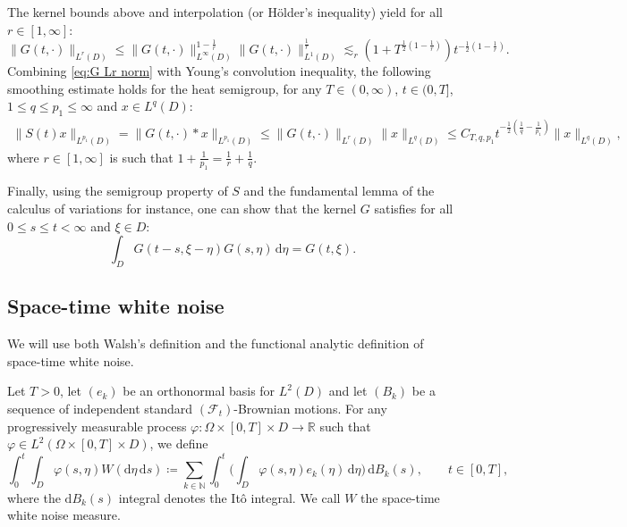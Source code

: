 \documentclass[10pt,a4paper]{amsart}
\numberwithin{equation}{section}
\newcommand{\N}{\mathbb{N}}
\newcommand{\R}{\mathbb{R}}
\newcommand{\ceqq}{\coloneqq}
\newcommand{\col}{\colon}
\newcommand{\F}{{\mathscr F}}
\newcommand{\Om}{\Omega}
\newcommand{\dd}{\,\mathrm{d}}
\newcommand{\ddd}{\mathrm{d}}
\begin{document}
The kernel bounds above and  interpolation (or H\"older's inequality) yield for all $r\in[1,\infty]$:
\begin{equation}\label{eq:G Lr norm}
    \|G(t,\cdot)\|_{L^r(D)}\leq \|G(t,\cdot)\|_{L^\infty(D)}^{1-\frac1r}\|G(t,\cdot)\|_{L^1(D)}^{\frac1r}
    \lesssim_r (1+T^{\frac12(1-\frac1r)})t^{-\frac12(1-\frac1r)}.
\end{equation}
Combining \eqref{eq:G Lr norm} with Young's convolution inequality, the following smoothing estimate holds for the heat semigroup, for any $T\in(0,\infty)$, $t\in(0,T]$, $1\leq q\leq p_1\leq \infty$ and $x\in L^q(D)$: 
\begin{align}
  \|S(t)x\|_{L^{p_1}(D)} =\|G(t,\cdot)*x\|_{L^{p_1}(D)}  
\leq \|G(t,\cdot)\|_{L^r(D)}\|x\|_{L^q(D)} 
\leq  C_{T,q,p_1} t^{-\frac12(\frac1q-\frac{1}{p_1})}\|x\|_{L^q(D)}, \label{eq:est}
\end{align}
where $r\in[1,\infty]$ is such that $1+\frac{1}{p_1}=\frac1r+\frac1q$.  

Finally, using the semigroup property of $S$ and the fundamental lemma of the calculus of variations for instance, one can show that the kernel $G$ satisfies for all $0\leq s\leq t<\infty$ and  $\xi\in D$: 
\begin{equation}\label{eq:kernel semigrp prop}
  \int_D G(t-s,\xi-\eta)G(s,\eta) \dd\eta = G(t,\xi). 
\end{equation}

\subsection{Space-time white noise}\label{sub:white noise}

We will use both Walsh's definition and the functional analytic definition of space-time white noise. 

Let $T>0$, let $(e_k)$ be an orthonormal basis for $L^2(D)$ and let $(B_k)$ be a sequence of independent standard $(\F_t)$-Brownian motions. 
For any progressively measurable process $\varphi\col \Om\times [0,T]\times D\to \R$ such that $\varphi\in L^2(\Om\times[0,T]\times D)$, we define 
\begin{equation}\label{eq:Walsh int}
\int_0^t\int_D \varphi(s,\eta)W(\ddd\eta\dd s)\ceqq \sum_{k\in \N}\int_0^t\Big(\int_D\varphi(s,\eta)e_k(\eta)\dd \eta\Big)\dd B_k(s), \qquad t\in[0,T],
\end{equation}
where the $\ddd B_k(s)$ integral denotes the It\^o integral. We call $W$ the space-time white noise measure. 
 
\end{document}
